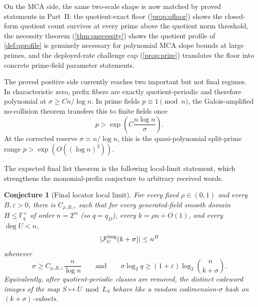 \documentclass[11pt]{article}
\newtheorem{conjecture}[conjecture]{Conjecture}
\theoremstyle{definition}
\newcommand{\F}{\mathbb F}
\newcommand{\eps}{\varepsilon}
\newcommand{\ImgFib}{\mathcal F^{\rm img}}
\begin{document}
On the MCA side, the same two-scale shape is now matched by proved statements in Part~II: the quotient-exact floor (\cref{prop:qfloor}) shows the closed-form quotient count survives at every prime above the quotient norm threshold, the necessity theorem (\cref{thm:qnecessity}) shows the quotient profile of \cref{def:qprofile} is genuinely necessary for polynomial MCA slope bounds at large primes, and the deployed-rate challenge cap (\cref{prop:prize}) translates the floor into concrete prime-field parameter statements.

The proved positive side currently reaches two important but not final regimes.  In characteristic zero, prefix fibers are exactly quotient-periodic and therefore polynomial at $\sigma\ge Cn/\log n$.  In prime fields $p\equiv1\pmod n$, the Galois-amplified no-collision theorem transfers this to finite fields once
\[
        p>\exp\!\left(C\frac{n\log n}{\sigma}\right).
\]
At the corrected reserve $\sigma\asymp n/\log n$, this is the quasi-polynomial split-prime range $p>\exp(O((\log n)^2))$.

The expected final list theorem is the following local-limit statement, which strengthens the monomial-prefix conjecture to arbitrary received words.
\begin{conjecture}[Final locator local limit]\label{conj:final-locator}
For every fixed $\rho\in(0,1)$ and every $B,\eps>0$, there is $C_{\rho,B,\eps}$ such that for every generated-field smooth domain $H\le\F_q^\times$ of order $n=2^m$ (so $q=q_D$), every $k=\rho n+O(1)$, and every $\deg U<n$,
\[
        |\ImgFib_U(k+\sigma)|\le n^B
\]
whenever
\[
        \sigma\ge C_{\rho,B,\eps}\frac n{\log n}
        \qquad\text{and}\qquad
        \sigma\log_2q\ge(1+\eps)\log_2\binom n{k+\sigma}.
\]
Equivalently, after quotient-periodic classes are removed, the distinct codeword
images of the map $S\mapsto U\bmod L_S$ behave like a random
codimension-$\sigma$ hash on $(k+\sigma)$-subsets.
\end{conjecture}
\end{document}
